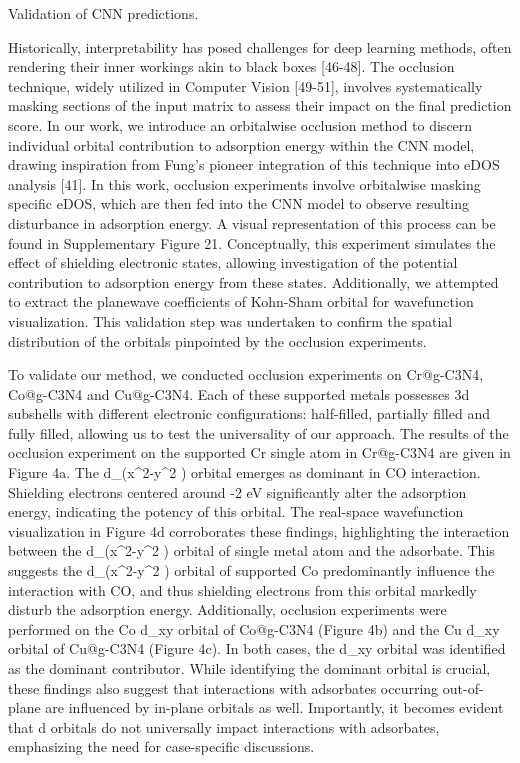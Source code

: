 Validation of CNN predictions.

Historically, interpretability has posed challenges for deep learning methods, often rendering their inner workings akin to black boxes [46-48]. The occlusion technique, widely utilized in Computer Vision [49-51], involves systematically masking sections of the input matrix to assess their impact on the final prediction score. In our work, we introduce an orbitalwise occlusion method to discern individual orbital contribution to adsorption energy within the CNN model, drawing inspiration from Fung’s pioneer integration of this technique into eDOS analysis [41]. In this work, occlusion experiments involve orbitalwise masking specific eDOS, which are then fed into the CNN model to observe resulting disturbance in adsorption energy. A visual representation of this process can be found in Supplementary Figure 21. Conceptually, this experiment simulates the effect of shielding electronic states, allowing investigation of the potential contribution to adsorption energy from these states. Additionally, we attempted to extract the planewave coefficients of Kohn-Sham orbital for wavefunction visualization. This validation step was undertaken to confirm the spatial distribution of the orbitals pinpointed by the occlusion experiments.

To validate our method, we conducted occlusion experiments on Cr@g-C3N4, Co@g-C3N4 and Cu@g-C3N4. Each of these supported metals possesses 3d subshells with different electronic configurations: half-filled, partially filled and fully filled, allowing us to test the universality of our approach. The results of the occlusion experiment on the supported Cr single atom in Cr@g-C3N4 are given in Figure 4a. The d_(x^2-y^2 ) orbital emerges as dominant in CO interaction. Shielding electrons centered around -2 eV significantly alter the adsorption energy, indicating the potency of this orbital. The real-space wavefunction visualization in Figure 4d corroborates these findings, highlighting the interaction between the d_(x^2-y^2 ) orbital of single metal atom and the adsorbate. This suggests the d_(x^2-y^2 ) orbital of supported Co predominantly influence the interaction with CO, and thus shielding electrons from this orbital markedly disturb the adsorption energy. Additionally, occlusion experiments were performed on the Co d_xy orbital of Co@g-C3N4 (Figure 4b) and the Cu d_xy orbital of Cu@g-C3N4 (Figure 4c). In both cases, the d_xy orbital was identified as the dominant contributor. While identifying the dominant orbital is crucial, these findings also suggest that interactions with adsorbates occurring out-of-plane are influenced by in-plane orbitals as well. Importantly, it becomes evident that d orbitals do not universally impact interactions with adsorbates, emphasizing the need for case-specific discussions.

